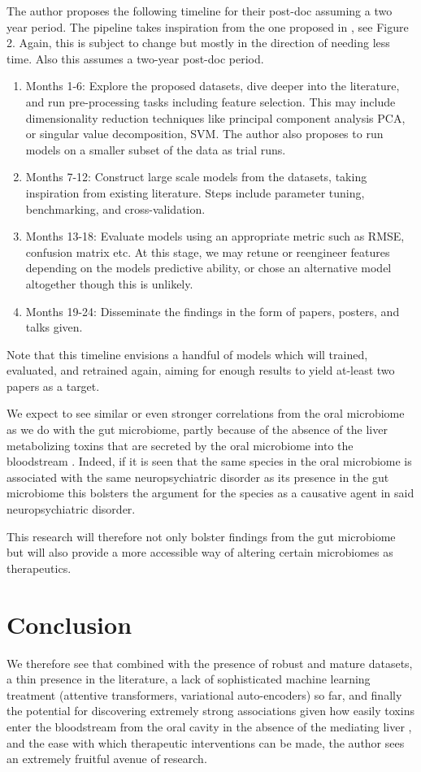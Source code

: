 \documentclass{article}
\begin{document}
\begin{multicols}{2}
The author proposes the following timeline for their post-doc assuming a two year period. The pipeline takes inspiration from the one proposed in \cite{li_machine_2022}, see Figure 2. Again, this is subject to change but mostly in the direction of needing less time. Also this assumes a two-year post-doc period. 
\begin{enumerate}[label = \roman*.]
	\item Months 1-6: Explore the proposed datasets, dive deeper into the literature, and run pre-processing tasks including feature selection. This may include dimensionality reduction techniques like principal component analysis PCA, or singular value decomposition, SVM. The author also proposes to run models on a smaller subset of the data as trial runs.
	\item Months 7-12: Construct large scale models from the datasets, taking inspiration from existing literature. Steps include parameter tuning, benchmarking, and cross-validation. 
	\item Months 13-18: Evaluate models using an appropriate metric such as RMSE, confusion matrix etc. At this stage, we may retune or reengineer features depending on the models predictive ability, or chose an alternative model altogether though this is unlikely.
	\item Months 19-24: Disseminate the findings in the form of papers, posters, and talks given. 
\end{enumerate}
Note that this timeline envisions a handful of models which will trained, evaluated, and retrained again, aiming for enough results to yield at-least two papers as a target.

We expect to see similar or even stronger correlations from the oral microbiome as we do with the gut microbiome, partly because of the absence of the liver metabolizing toxins that are secreted by the oral microbiome into the bloodstream \cite{REFISCH2023109568}. Indeed, if it is seen that the same species in the oral microbiome is associated with the same neuropsychiatric disorder as its presence in the gut microbiome this bolsters the argument for the species as a causative agent in said neuropsychiatric disorder.

This research will therefore not only bolster findings from the gut microbiome but will also provide a more accessible way of altering certain microbiomes as therapeutics. 
\section{Conclusion}
We therefore see that combined with the presence of robust and mature datasets, a thin presence in the literature, a lack of sophisticated machine learning treatment (attentive transformers, variational auto-encoders) so far, and finally the potential for discovering extremely strong associations given how easily toxins enter the bloodstream from the oral cavity in the absence of the mediating liver \cite{REFISCH2023109568}, and the ease with which therapeutic interventions can be made, the author sees an extremely fruitful avenue of research. 


\end{multicols}
\end{document}
